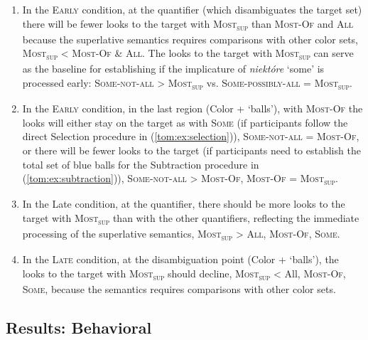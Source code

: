 \documentclass[output=paper]{langscibook}
\begin{document}
\begin{enumerate}[label=(\roman*)]
\item In the \textsc{Early} condition, at the quantifier (which disambiguates the target set) there will be fewer looks to the
target with \textsc{Most\textsubscript{sup}} than \textsc{Most-Of} and \textsc{All} because the superlative semantics
requires comparisons with other color sets, \textsc{Most\textsubscript{sup}} {\textless} \textsc{Most-Of} \&
\textsc{All}. The looks to the target with \textsc{Most\textsubscript{sup}} can serve as the baseline for establishing if the implicature of
\textit{niektóre} `some' is processed early: \textsc{Some-not-all} {\textgreater} \textsc{Most\textsubscript{sup}} vs.
\textsc{Some-possibly-all} = \textsc{Most\textsubscript{sup}}.

\item In the \textsc{Early} condition, in the last region (Color + `balls'), with \textsc{Most-Of} the looks will either stay on the target as with \textsc{Some} (if participants follow the direct Selection procedure in (\ref{tom:ex:selection})), \textsc{Some-not-all} = \textsc{Most-Of}, or there will be fewer looks to the target (if participants need to establish the total set of blue balls for the Subtraction procedure in (\ref{tom:ex:subtraction})), \textsc{Some-not-all} {\textgreater} \textsc{Most-Of}, \textsc{Most-Of} = \textsc{Most\textsubscript{sup}}.

\item In the Late condition, at the quantifier, there should be more looks to the target with
\textsc{Most\textsubscript{sup}} than with the other quantifiers, reflecting the immediate processing of the superlative
semantics, \textsc{Most\textsubscript{sup}} {\textgreater} \textsc{All}, \textsc{Most-Of}, \textsc{Some}.

\item In the \textsc{Late} condition, at the disambiguation point (Color + `balls'), the looks to the target with \textsc{Most\textsubscript{sup}} should decline, \textsc{Most\textsubscript{sup}} {\textless} All, \textsc{Most-Of}, \textsc{Some}, because the semantics requires comparisons with other color sets.
\end{enumerate}



\subsection{Results: Behavioral} 
\end{document}
